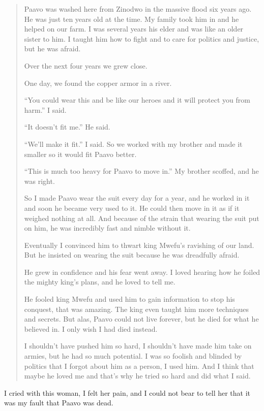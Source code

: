 \begin{quote}
Paa\-vo was washed here from Zi\-no\-dwo in the massive flood six years ago. He was just ten years old at the time. My family took him in and he helped on our farm. I was several years his elder and was like an older sister to him. I taught him how to fight and to care for politics and justice, but he was afraid.

Over the next four years we grew close.

One day, we found the copper armor in a river.

``You could wear this and be like our heroes and it will protect you from harm.'' I said.

``It doesn't fit me.'' He said.

``We'll make it fit.'' I said. So we worked with my brother and made it smaller so it would fit Paa\-vo better.

``This is much too heavy for Paa\-vo to move in.'' My brother scoffed, and he was right.

So I made Paa\-vo wear the suit every day for a year, and he worked in it and soon he became very used to it. He could then move in it as if it weighed nothing at all. And because of the strain that wearing the suit put on him, he was incredibly fast and nimble without it.

Eventually I convinced him to thwart king Mwe\-fu's ravishing of our land. But he insisted on wearing the suit because he was dreadfully afraid.

He grew in confidence and his fear went away. I loved hearing how he foiled the mighty king's plans, and he loved to tell me.

He fooled king Mwe\-fu and used him to gain information to stop his conquest, that was amazing. The king even taught him more techniques and secrets. But alas, Paa\-vo could not live forever, but he died for what he believed in. I only wish I had died instead.

I shouldn't have pushed him so hard, I shouldn't have made him take on armies, but he had so much potential. I was so foolish and blinded by politics that I forgot about him as a person, I used him. And I think that maybe he loved me and that's why he tried so hard and did what I said.

\end{quote}

I cried with this woman, I felt her pain, and I could not bear to tell her that it was my fault that Paa\-vo was dead.

